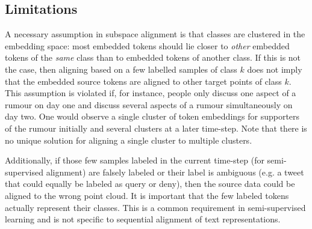 \documentclass[letterpaper]{article} %
\begin{document}
\subsection{Limitations}
A necessary assumption in subspace alignment is that classes are clustered in the embedding space: most embedded tokens should lie closer to \textit{other} embedded tokens of the \textit{same} class than to embedded tokens of another class. If this is not the case, then aligning based on a few labelled samples of class $k$ does not imply that the embedded source tokens are aligned to other target points of class $k$. This assumption is violated if, for instance, people only discuss one aspect of a rumour on day one and discuss several aspects of a rumour simultaneously on day two. One would observe a single cluster of token embeddings for supporters of the rumour initially and several clusters at a later time-step. 
Note that there is no unique solution for aligning a single cluster to multiple clusters.

Additionally, if those few samples labeled in the current time-step (for semi-supervised alignment) are falsely labeled or their label is ambiguous (e.g. a tweet that could equally be labeled as {\sc query} or {\sc deny}), then the source data could be aligned to the wrong point cloud. It is important that the few labeled tokens actually represent their classes. This is a common requirement in semi-supervised learning and is not specific to sequential alignment of text representations.


\end{document}
